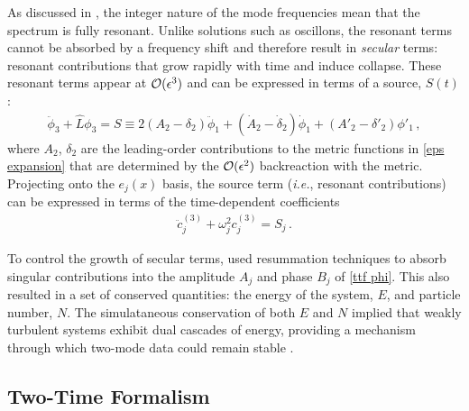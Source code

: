 \documentclass[../PhD.tex]{subfiles}
\begin{document}
As discussed in \cite{1412.3249, 1407.6273, 1508.04943}, the integer nature of the mode frequencies mean that the spectrum is fully resonant. Unlike solutions such as oscillons, the resonant terms cannot be absorbed by a frequency shift and therefore result in \emph{secular} terms: resonant contributions that grow rapidly with time and induce collapse. These resonant terms appear at $\mathcal O (\epsilon^3)$ and can be expressed in terms of a source, $S(t)$:
\begin{align}
\ddot \phi_3 + \hat L \phi_3 = S \equiv 2 (A_2 - \delta_2) \ddot \phi_1 + ( \dot A_2 - \dot \delta_2 ) \dot \phi_1 + (A'_2 - \delta'_2) \phi'_1 \, ,
\end{align}
where $A_2$, $\delta_2$ are the leading-order contributions to the metric functions in \eqref{eps expansion} that are determined by the $\mathcal O(\epsilon^2)$ backreaction with the metric. Projecting onto the $e_j(x)$ basis, the source term ({\it i.e.}, resonant contributions) can be expressed in terms of the time-dependent coefficients
\begin{align}
\ddot c_j^{(3)} + \omega_j^2 c_j^{(3)} = S_j \, .
\end{align}  

To control the growth of secular terms, \cite{1412.3249} used resummation techniques to absorb singular contributions into the amplitude $A_j$ and phase $B_j$ of \eqref{ttf phi}. This also resulted in a set of conserved quantities: the energy of the system, $E$, and particle number, $N$. The simulataneous conservation of both $E$ and $N$ implied that weakly turbulent systems exhibit dual cascades of energy, providing a mechanism through which two-mode data could remain stable \cite{1412.4761}.


\subsection{Two-Time Formalism}
\end{document}
